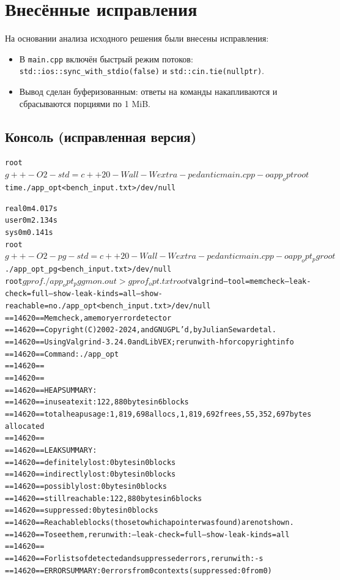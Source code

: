 \section{Внесённые исправления}
На основании анализа исходного решения были внесены исправления:
\begin{itemize}
    \item В \texttt{main.cpp} включён быстрый режим потоков: \texttt{std::ios::sync\_with\_stdio(false)} и \texttt{std::cin.tie(nullptr)}.
    \item Вывод сделан буферизованным: ответы на команды накапливаются и сбрасываются порциями по 1 MiB.
\end{itemize}

\subsection{Консоль (исправленная версия)}
\begin{alltt}
root$ g++ -O2 -std=c++20 -Wall -Wextra -pedantic main.cpp -o app_opt
root$ time ./app_opt < bench_input.txt > /dev/null

real    0m4.017s
user    0m2.134s
sys     0m0.141s
root$ g++ -O2 -pg -std=c++20 -Wall -Wextra -pedantic main.cpp -o app_opt_pg
root$ ./app_opt_pg < bench_input.txt > /dev/null
root$ gprof ./app_opt_pg gmon.out > gprof_opt.txt
root$ valgrind --tool=memcheck --leak-check=full --show-leak-kinds=all --show-reachable=no ./app_opt < bench_input.txt > /dev/null 
==14620== Memcheck, a memory error detector
==14620== Copyright (C) 2002-2024, and GNU GPL'd, by Julian Seward et al.
==14620== Using Valgrind-3.24.0 and LibVEX; rerun with -h for copyright info
==14620== Command: ./app_opt
==14620== 
==14620== 
==14620== HEAP SUMMARY:
==14620==     in use at exit: 122,880 bytes in 6 blocks
==14620==   total heap usage: 1,819,698 allocs, 1,819,692 frees, 55,352,697 bytes allocated
==14620== 
==14620== LEAK SUMMARY:
==14620==    definitely lost: 0 bytes in 0 blocks
==14620==    indirectly lost: 0 bytes in 0 blocks
==14620==      possibly lost: 0 bytes in 0 blocks
==14620==    still reachable: 122,880 bytes in 6 blocks
==14620==         suppressed: 0 bytes in 0 blocks
==14620== Reachable blocks (those to which a pointer was found) are not shown.
==14620== To see them, rerun with: --leak-check=full --show-leak-kinds=all
==14620== 
==14620== For lists of detected and suppressed errors, rerun with: -s
==14620== ERROR SUMMARY: 0 errors from 0 contexts (suppressed: 0 from 0)
\end{alltt}

